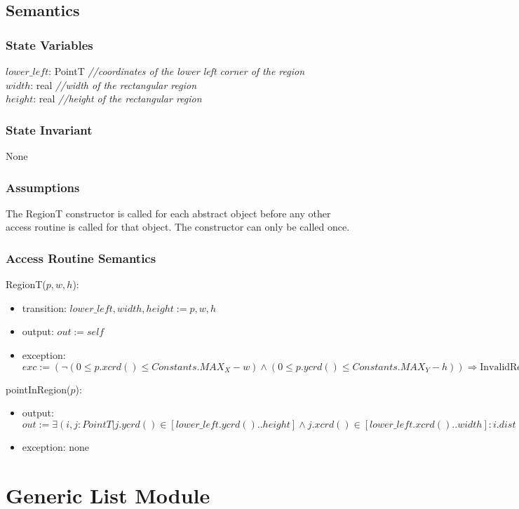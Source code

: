 \documentclass[12pt]{article}
\begin{document}
\subsection* {Semantics}
\subsubsection* {State Variables}
$\mathit{lower\_left}$: PointT {\it //coordinates of the lower left corner of the region}\\
$\mathit{width}$: real {\it //width of the rectangular region}\\
$\mathit{height}$: real {\it //height of the rectangular region}
\subsubsection* {State Invariant}
None
\subsubsection* {Assumptions}
The RegionT constructor is called for each abstract object before any other access routine is called for that
object.  The constructor can only be called once.
\subsubsection* {Access Routine Semantics}
\noindent RegionT($p, w, h$):
\begin{itemize}
\item transition: $\mathit{lower\_left}, \mathit{width}, \mathit{height} := p, w, h$
\item output: $out := \mathit{self}$
\item exception: $exc := (\lnot ( 0 \leq p.xcrd() \leq Constants.MAX_X - w) \land (0 \leq p.ycrd()  \leq Constants.MAX_Y - h)) \Rightarrow \mbox{InvalidRegionException} $
\end{itemize}
\noindent pointInRegion($p$):
\begin{itemize}
\item output: $\mathit{out} :=  \exists (i, j : PointT| j.ycrd() \in [lower\_left.ycrd() .. height] \land j.xcrd() \in [lower\_left.xcrd() .. width] : i.dist(j) < TOLERANCE) $
\item exception: none
\end{itemize}
\newpage
\section* {Generic List Module}
\end{document}
